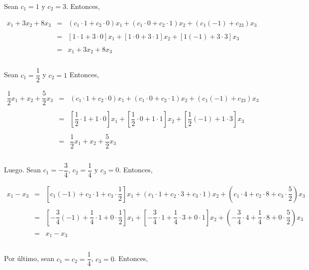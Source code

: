 \begin{enumerate}[\bfseries 1.]
	Sean $c_1=1$ y $c_2=3$. Entonces,

	$$\begin{array}{rcl}
	    x_1+3x_2+8x_3 &=& (c_1\cdot 1+c_2\cdot 0)x_1+(c_1\cdot 0 + c_2\cdot 1)x_2 + (c_1(-1)+c_23)x_3\\\\
			  &=& \left[1\cdot 1+3\cdot 0\right]x_1+\left[1\cdot 0+3\cdot 1\right]x_2+\left[1(-1)+3\cdot 3\right]x_3\\\\
			  &=& x_1+3x_2+8x_3\\\\
	\end{array}$$

	Sean $c_1=\dfrac{1}{2}$ y $c_2=1$ Entonces,

	$$\begin{array}{rcl}
	    \dfrac{1}{2}x_1+x_2+\dfrac{5}{2}x_3 &=& (c_1\cdot 1+c_2\cdot 0)x_1+(c_1\cdot 0 + c_2\cdot 1)x_2 + (c_1(-1)+c_23)x_3\\\\
	    			  &=& \left[\dfrac{1}{2}\cdot 1+1\cdot 0\right]x_1+\left[\dfrac{1}{2}\cdot 0+1\cdot 1\right]x_2+\left[\dfrac{1}{2}(-1)+1\cdot 3\right]x_3\\\\
				  	    			  &=& \dfrac{1}{2}x_1+x_2+\dfrac{5}{2}x_3\\\\
	\end{array}$$

	Luego. Sean $c_1=-\dfrac{3}{4}$, $c_2=\dfrac{1}{4}$ y $c_3=0$. Entonces, 

	$$\begin{array}{rcl}
	    x_1-x_3 &=& \left[c_1(-1)+c_2\cdot 1 + c_3\cdot \dfrac{1}{2}\right]x_1+(c_1\cdot 1 + c_2\cdot 3 + c_3\cdot 1)x_2+\left(c_1 \cdot 4+c_2\cdot 8 + c_3\cdot \dfrac{5}{2}\right)x_3\\\\
	    		    &=& \left[-\dfrac{3}{4}(-1)+\dfrac{1}{4}\cdot 1 + 0\cdot \dfrac{1}{2}\right]x_1+\left[-\dfrac{3}{4}\cdot 1 + \dfrac{1}{4}\cdot 3 + 0\cdot 1\right]x_2+\left(-\dfrac{3}{4} \cdot 4+\dfrac{1}{4}\cdot 8 + 0\cdot \dfrac{5}{2}\right)x_3\\\\
			    &=&x_1-x_3\\\\
	\end{array}$$ 

	Por último, sean $c_1=c_2=\dfrac{1}{4}$, $c_3=0$. Entonces,


\end{enumerate}
